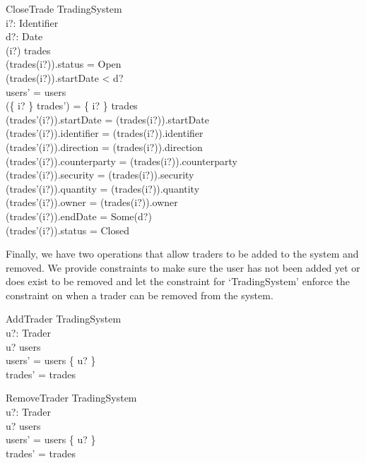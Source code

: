\documentclass{article}
\begin{document}
\begin{schema}{CloseTrade}
\Delta TradingSystem \\
i?: Identifier \\
d?: Date \\ 
\where
(i?) \in \dom trades \\
(trades(i?)).status = Open \\ 
(trades(i?)).startDate < d? \\
users' = users \\
(\{ i? \} \ndres trades') = \{ i? \} \ndres trades \\
(trades'(i?)).startDate = (trades(i?)).startDate \\
(trades'(i?)).identifier = (trades(i?)).identifier \\
(trades'(i?)).direction = (trades(i?)).direction \\
(trades'(i?)).counterparty = (trades(i?)).counterparty \\
(trades'(i?)).security = (trades(i?)).security \\
(trades'(i?)).quantity = (trades(i?)).quantity \\
(trades'(i?)).owner = (trades(i?)).owner \\
(trades'(i?)).endDate = Some(d?) \\ 
(trades'(i?)).status = Closed \\
\end{schema}

\hspace{-0.7cm} Finally, we have two operations that allow traders to be added to the system and removed. We provide constraints to make sure the user has not been added yet or does exist to be removed and let the constraint for ‘TradingSystem’ enforce the constraint on when a trader can be removed from the system. 

\begin{schema}{AddTrader}
\Delta TradingSystem \\
u?: Trader \\ 
\where
u? \notin users \\
users' = users \cup \{ u? \} \\
trades' = trades \\
\end{schema}

\begin{schema}{RemoveTrader}
\Delta TradingSystem \\
u?: Trader \\ 
\where
u? \in users \\
users' = users \setminus \{ u? \} \\
trades' = trades \\
\end{schema}
\end{document}
